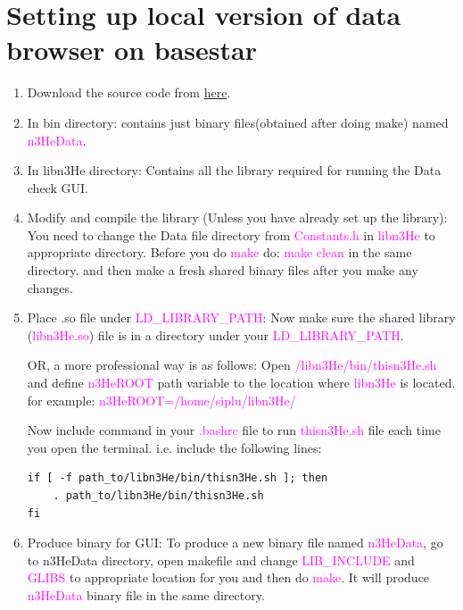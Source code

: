\documentclass[12pt]{article}
\begin{document}
\section{Setting up local version of data browser on basestar}
\begin{enumerate}
\item Download the source code from \href{http://latifkabir.github.io/n3He_Soft/}{here}. \\

\item In bin directory: contains just binary files(obtained after doing make) named \textcolor{magenta}{n3HeData}.

\item In libn3He directory: Contains all the library required for running the Data check GUI.

\item Modify and compile the library (Unless you have already set up the library):
   You need to change the Data file directory from \textcolor{magenta}{Constants.h} in \textcolor{magenta}{libn3He} to appropriate directory. Before you do \textcolor{magenta}{make} do: \textcolor{magenta}{make clean}   
   in the same directory.  and then make a fresh shared binary files after you make any changes.

\item Place .so file under \textcolor{magenta}{LD\_LIBRARY\_PATH}:
   Now make sure the shared library (\textcolor{magenta}{libn3He.so}) file is in a directory under your \textcolor{magenta}{LD\_LIBRARY\_PATH}. 

   OR, a more professional way is as follows:
   Open \textcolor{magenta}{\*/libn3He/bin/thisn3He.sh} and define \textcolor{magenta}{n3HeROOT} path variable to the location where \textcolor{magenta}{libn3He} is located.
   for example: \textcolor{magenta}{n3HeROOT=/home/siplu/libn3He/}
   
Now include command in your \textcolor{magenta}{.bashrc} file to run \textcolor{magenta}{thisn3He.sh} file each time you open the terminal. i.e. include the following lines:

\begin{lstlisting}
if [ -f path_to/libn3He/bin/thisn3He.sh ]; then
	. path_to/libn3He/bin/thisn3He.sh
fi
\end{lstlisting}

\item Produce binary for GUI:
To produce a new binary file named \textcolor{magenta}{n3HeData}, go to n3HeData directory, open makefile and change \textcolor{magenta}{LIB\_INCLUDE} and \textcolor{magenta}{GLIBS} to
  appropriate location for you and then do \textcolor{magenta}{make}. It will produce \textcolor{magenta}{n3HeData} binary file in the same directory. 


\end{enumerate}
\end{document}
